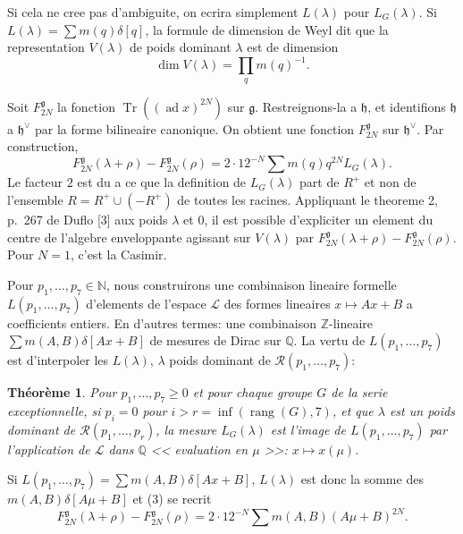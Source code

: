 \documentclass[11pt,a4paper]{article}
\theoremstyle{plain}
\newtheorem{theorem}{Th\'eor\`eme}
\theoremstyle{definition}
\DeclareMathOperator{\Tr}{Tr}
\DeclareMathOperator{\ad}{ad}
\DeclareMathOperator{\rank}{rang}
\newcommand{\rang}{\rank}
\begin{document}
Si cela ne cree pas d'ambiguite, on ecrira simplement $L(\lambda)$ pour $L_G(\lambda)$. Si $L(\lambda) = \sum m(q)\delta[q]$, la formule de dimension de Weyl dit que la representation $V(\lambda)$ de poids dominant $\lambda$ est de dimension
\begin{equation}\label{eq:2}
\dim V(\lambda) = \prod_q m(q)^{-1}.
\end{equation}

Soit $F_{2N}^{\mathfrak{g}}$ la fonction $\Tr((\ad x)^{2N})$ sur $\mathfrak{g}$. Restreignons-la a $\mathfrak{h}$, et identifions $\mathfrak{h}$ a $\mathfrak{h}^\vee$ par la forme bilineaire canonique. On obtient une fonction $F_{2N}^{\mathfrak{g}}$ sur $\mathfrak{h}^\vee$. Par construction,
\begin{equation}\label{eq:3}
F_{2N}^{\mathfrak{g}}(\lambda + \rho) - F_{2N}^{\mathfrak{g}}(\rho) = 2 \cdot 12^{-N} \sum m(q) q^{2N} L_G(\lambda).
\end{equation}
Le facteur $2$ est du a ce que la definition de $L_G(\lambda)$ part de $R^+$ et non de l'ensemble $R = R^+ \cup (-R^+)$ de toutes les racines. Appliquant le theoreme 2, p.~267 de Duflo [3] aux poids $\lambda$ et $0$, il est possible d'expliciter un element du centre de l'algebre enveloppante agissant sur $V(\lambda)$ par $F_{2N}^{\mathfrak{g}}(\lambda+\rho) - F_{2N}^{\mathfrak{g}}(\rho)$. Pour $N = 1$, c'est la Casimir.

\smallskip

Pour $p_1,\dots,p_7 \in \mathbb{N}$, nous construirons une combinaison lineaire formelle $L(p_1,\dots,p_7)$ d'elements de l'espace $\mathcal{L}$ des formes lineaires $x \mapsto Ax + B$ a coefficients entiers. En d'autres termes: une combinaison $\mathbb{Z}$-lineaire $\sum m(A,B)\delta[Ax + B]$ de mesures de Dirac sur $\mathbb{Q}$. La vertu de $L(p_1,\dots,p_7)$ est d'interpoler les $L(\lambda)$, $\lambda$ poids dominant de $\mathcal{R}(p_1,\dots,p_7)$:

\begin{theorem}\label{thm:1}
Pour $p_1,\dots,p_7 \geq 0$ et pour chaque groupe $G$ de la serie exceptionnelle, si $p_i = 0$ pour $i > r = \inf(\rang(G),7)$, et que $\lambda$ est un poids dominant de $\mathcal{R}(p_1,\dots,p_r)$, la mesure $L_G(\lambda)$ est l'image de $L(p_1,\dots,p_7)$ par l'application de $\mathcal{L}$ dans $\mathbb{Q}$ << evaluation en $\mu$ >>: $x \mapsto x(\mu)$.
\end{theorem}

Si $L(p_1,\dots,p_7) = \sum m(A,B)\delta[Ax + B]$, $L(\lambda)$ est donc la somme des $m(A,B)\delta[A\mu + B]$ et (3) se recrit
\begin{equation}\label{eq:4}
F_{2N}^{\mathfrak{g}}(\lambda + \rho) - F_{2N}^{\mathfrak{g}}(\rho) = 2 \cdot 12^{-N} \sum m(A,B) (A\mu + B)^{2N}.
\end{equation}
\end{document}
